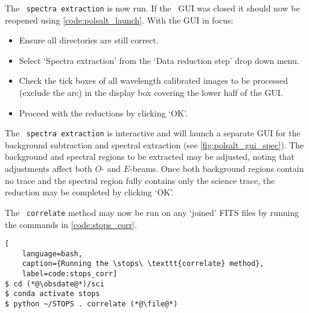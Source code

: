 The \polsalt\ \texttt{spectra extraction} is now run. If the \polsalt\ \gls{GUI} was closed it should now be reopened using \autoref{code:polsalt_launch}. With the \gls{GUI} in focus:
\begin{itemize}
    \item Ensure all directories are still correct.
    \item Select `Spectra extraction' from the `Data reduction step' drop down menu.
    \item Check the tick boxes of all wavelength calibrated images to be processed (exclude the arc) in the display box covering the lower half of the \gls{GUI}.
    \item Proceed with the reductions by clicking `OK'.
\end{itemize}

The \polsalt\ \texttt{spectra extraction} is interactive and will launch a separate \gls{GUI} for the background subtraction and spectral extraction (see \autoref{fig:polsalt_gui_spec}). The background and spectral regions to be extracted may be adjusted, noting that adjustments affect both $O$- and $E$-beams. Once both background regions contain no trace and the spectral region fully contains only the science trace, the reduction may be completed by clicking `OK'.

The \stops\ \texttt{correlate} method may now be run on any `joined' \gls{FITS} files by running the commands in \autoref{code:stops_corr}.

\begin{lstlisting}[
    language=bash,
    caption={Running the \stops\ \texttt{correlate} method},
    label=code:stops_corr]
$ cd (*@\obsdate@*)/sci
$ conda activate stops
$ python ~/STOPS . correlate (*@\file@*)
\end{lstlisting}

\pagebreak

